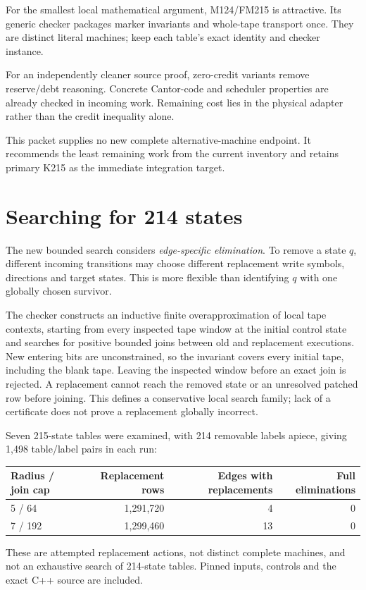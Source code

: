\documentclass[11pt]{article}
\theoremstyle{definition}\newtheorem{definition}[theorem]{Definition}
\begin{document}
For the smallest local mathematical argument, M124/FM215 is attractive. Its generic checker packages marker invariants and whole-tape transport once. They are distinct literal machines; keep each table's exact identity and checker instance.

For an independently cleaner source proof, zero-credit variants remove reserve/debt reasoning. Concrete Cantor-code and scheduler properties are already checked in incoming work. Remaining cost lies in the physical adapter rather than the credit inequality alone.

This packet supplies no new complete alternative-machine endpoint. It recommends the least remaining work from the current inventory and retains primary K215 as the immediate integration target.

\section{Searching for 214 states}
The new bounded search considers \emph{edge-specific elimination}. To remove a state $q$, different incoming transitions may choose different replacement write symbols, directions and target states. This is more flexible than identifying $q$ with one globally chosen survivor.

The checker constructs an inductive finite overapproximation of local tape contexts, starting from every inspected tape window at the initial control state and searches for positive bounded joins between old and replacement executions. New entering bits are unconstrained, so the invariant covers every initial tape, including the blank tape. Leaving the inspected window before an exact join is rejected. A replacement cannot reach the removed state or an unresolved patched row before joining. This defines a conservative local search family; lack of a certificate does not prove a replacement globally incorrect.

Seven 215-state tables were examined, with 214 removable labels apiece, giving 1,498 table/label pairs in each run:
\begin{center}
\begin{tabular}{lrrr}
\toprule
Radius / join cap & Replacement rows & Edges with replacements & Full eliminations\\
\midrule
5 / 64 & 1,291,720 & 4 & 0\\
7 / 192 & 1,299,460 & 13 & 0\\
\bottomrule
\end{tabular}
\end{center}
These are attempted replacement actions, not distinct complete machines, and not an exhaustive search of 214-state tables. Pinned inputs, controls and the exact C++ source are included.
\end{document}
